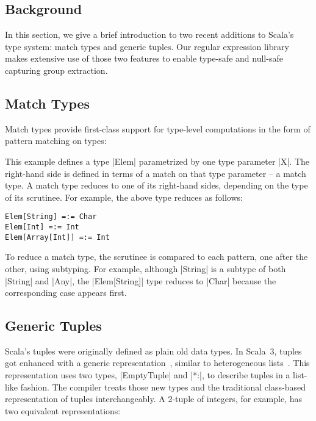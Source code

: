 \begin{diff}
\section{Background}
\label{sec:background}

In this section, we give a brief introduction to two recent additions to Scala's type system: match types and generic tuples.
Our regular expression library makes extensive use of those two features to enable type-safe and null-safe capturing group extraction.

\subsection{Match Types}

Match types provide first-class support for type-level computations in the form of pattern matching on types:

\elemExample

\noindent
This example defines a type |Elem| parametrized by one type parameter |X|.
The right-hand side is defined in terms of a match on that type parameter -- a match type.
A match type reduces to one of its right-hand sides, depending on the type of its scrutinee.
For example, the above type reduces as follows:

\begin{lstlisting}
Elem[String] =:= Char
Elem[Int] =:= Int
Elem[Array[Int]] =:= Int
\end{lstlisting}

\noindent
To reduce a match type, the scrutinee is compared to each pattern, one after the other, using subtyping.
For example, although |String| is a subtype of both |String| and |Any|, the |Elem[String]| type reduces to |Char| because the corresponding case appears first.

\subsection{Generic Tuples}
\label{subsec:generic-tuples}

Scala's tuples were originally defined as plain old data types.
In Scala~3, tuples got enhanced with a generic representation~\citep{bazzucchi2021tuples}, similar to heterogeneous lists~\citep{kiselyov2004strongly}.
This representation uses two types, |EmptyTuple| and |*:|, to describe tuples in a list-like fashion.
The compiler treats those new types and the traditional class-based representation of tuples interchangeably.
A 2-tuple of integers, for example, has two equivalent representations:


\end{diff}
